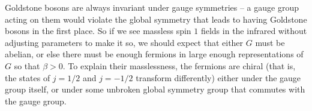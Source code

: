 Goldstone bosons are always invariant under gauge symmetries -- a gauge
group acting on them would violate the global symmetry that leads to
having Goldstone bosons in the first place.
So if we see massless spin $1$ fields in the infrared without adjusting
parameters to make it so, we should expect that  either $G$ must be
abelian, or else there must be enough  fermions in large enough
representations of $G$ so that $\beta>0$.
To explain their masslessness, the 
 fermions are chiral (that is, the states of $j=1/2$ and $j=-1/2$
transform differently) either under the gauge group itself,
or under some unbroken global symmetry group that commutes with the
gauge group.






